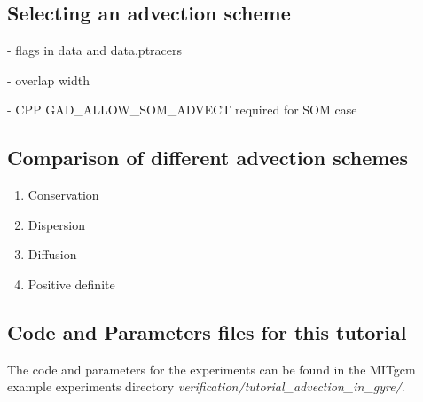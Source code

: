 \subsection{Selecting an advection scheme}

- flags in data and data.ptracers

- overlap width

- CPP GAD\_ALLOW\_SOM\_ADVECT required for SOM case

\subsection{Comparison of different advection schemes}

\begin{enumerate}
\item{Conservation}
\item{Dispersion}
\item{Diffusion}
\item{Positive definite}
\end{enumerate}

\subsection{Code and Parameters files for this tutorial}

The code and parameters for the experiments can be found in the MITgcm example experiments 
directory {\it verification/tutorial\_advection\_in\_gyre/}.







